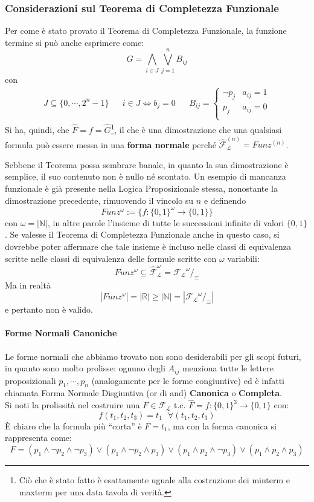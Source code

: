 \subsubsection{Considerazioni sul Teorema di Completezza Funzionale}
Per come è stato provato il Teorema di Completezza Funzionale, la funzione termine si può anche esprimere come: 
$$
G = \bigwedge\limits_{i \in J} \bigvee_{j = 1}^{n} B_{ij}
$$
con
\begin{align*}
  J \subseteq \{0, \cdots, 2^n-1\} &&
  i \in J \iff b_j = 0 &&
  B_{ij} =
  \begin{cases}
    \neg p_j & a_{ij} = 1 \\
    p_j & a_{ij} = 0 \\
  \end{cases}
\end{align*}
Si ha, quindi, che $\hat{F} = f = \hat{G}$\footnote{Ciò che è stato fatto è esattamente uguale alla costruzione dei minterm e maxterm per una data tavola di verità.}, il che è una dimostrazione che una qualsiasi formula può essere messa in una \textbf{forma normale} perché $\hat{\mathscr{F}}_\mathscr{L}^{(n)} = Funz^{(n)}$.

Sebbene il Teorema possa sembrare banale, in quanto la sua dimostrazione è
semplice, il suo contenuto non è nullo né scontato. Un esempio di mancanza 
funzionale è già presente nella Logica Proposizionale stessa, nonostante 
la dimostrazione precedente, rimuovendo il vincolo su $n$ e definendo
$$
Funz^{\omega} := \{f:\{0,1\}^{\omega} \rightarrow \{0,1\}\}
$$
con $\omega = |\mathbb{N}|$, in altre parole l'insieme di tutte le successioni 
infinite di valori $\{0,1\}$. Se valesse il Teorema di Completezza Funzionale 
anche in questo caso, si dovrebbe poter affermare che tale insieme 
è incluso nelle classi di equivalenza scritte nelle classi di equivalenza 
delle formule scritte con $\omega$ variabili: 
$$
Funz^{\omega} \subseteq \hat{\mathscr{F}}_\mathscr{L}^{\omega} = \mathscr{F_L}^{\omega}/_\equiv
$$
Ma in realtà
$$
|Funz^{\omega}| = |\mathbb{R}| \geq |\mathbb{N}| = |\mathscr{F_L}^{\omega}/_\equiv|
$$
e pertanto non è valido. 

\paragraph{Forme Normali Canoniche}
Le forme normali che abbiamo trovato non sono desiderabili per gli scopi 
futuri, in quanto sono molto prolisse: ognuno degli $A_{ij}$ menziona 
tutte le lettere proposizionali $p_1, \cdots, p_n$ (analogamente per le 
forme congiuntive) ed è infatti chiamata Forma Normale Disgiuntiva (or di and) \textbf{Canonica} o \textbf{Completa}. \\
Si noti la prolissità nel costruire una $F \in \mathscr{F_L}$ t.c. $\hat F = f : \{0, 1\}^3 \rightarrow \{0, 1\}$ con: 
$$
f(t_1, t_2, t_3) = t_1 ~~~ \forall (t_1, t_2, t_3)
$$
È chiaro che la formula più ``corta'' è $F = t_1$, ma con la forma 
canonica si rappresenta come:
$$
F = (p_1 \land \neg p_2 \land \neg p_3) \lor (p_1 \land \neg p_2 \land p_3) \lor (p_1 \land p_2 \land \neg p_3) \lor (p_1 \land p_2 \land p_3)
$$

